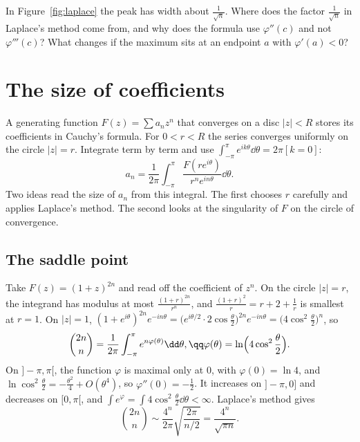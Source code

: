 \begin{think}
In Figure~\ref{fig:laplace} the peak has width about $\frac1{\sqrt n}$. Where does the factor $\frac1{\sqrt n}$ in Laplace's method come from, and why does the formula use $\varphi''(c)$ and not $\varphi'''(c)$? What changes if the maximum sits at an endpoint $a$ with $\varphi'(a)<0$?
\end{think}

\section{The size of coefficients}

A generating function $F(z)=\sum a_nz^n$ that converges on a disc $|z|<R$ stores its coefficients in Cauchy's formula. For $0<r<R$ the series converges uniformly on the circle $|z|=r$. Integrate term by term and use $\int_{-\pi}^\pi e^{ik\theta}\dd\theta=2\pi[k=0]$:
\[
a_n=\frac1{2\pi}\int_{-\pi}^\pi\frac{F(re^{i\theta})}{r^ne^{in\theta}}\dd\theta.
\]
Two ideas read the size of $a_n$ from this integral. The first chooses $r$ carefully and applies Laplace's method. The second looks at the singularity of $F$ on the circle of convergence.

\subsection*{The saddle point}

\begin{example}\label{ex:centralsaddle}
Take $F(z)=(1+z)^{2n}$ and read off the coefficient of $z^n$. On the circle $|z|=r$, the integrand has modulus at most $\frac{(1+r)^{2n}}{r^n}$, and $\frac{(1+r)^2}r=r+2+\frac1r$ is smallest at $r=1$. On $|z|=1$, $(1+e^{i\theta})^{2n}e^{-in\theta}=\bigl(e^{i\theta/2}\cdot2\cos\frac\theta2\bigr)^{2n}e^{-in\theta}=\bigl(4\cos^2\frac\theta2\bigr)^n$, so
\[
\begin{gathered}\binom{2n}n=\frac1{2\pi}\int_{-\pi}^\pi e^{n\varphi(\theta)}\dd\theta,\qq\varphi(\theta)=\ln\Bigl(4\cos^2\frac\theta2\Bigr).\end{gathered}
\]
On $]-\pi,\pi[$, the function $\varphi$ is maximal only at $0$, with $\varphi(0)=\ln4$, and $\ln\cos^2\frac\theta2=-\frac{\theta^2}4+O(\theta^4)$, so $\varphi''(0)=-\frac12$. It increases on $]-\pi,0]$ and decreases on $[0,\pi[$, and $\int e^\varphi=\int4\cos^2\frac\theta2\dd\theta<\infty$. Laplace's method gives
\[
\binom{2n}n\sim\frac{4^n}{2\pi}\sqrt{\frac{2\pi}{n/2}}=\frac{4^n}{\sqrt{\pi n}}.
\]
\end{example}


